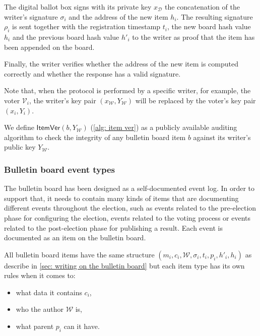 The digital ballot box signs with its private key $x_\mathcal{D}$ the concatenation of the writer's signature $\sigma_i$ and the address of the new item $h_i$. The resulting signature $\rho_i$ is sent together with the registration timestamp $t_i$, the new board hash value $h_i$ and the previous board hash value $h'_i$ to the writer as proof that the item has been appended on the board.

Finally, the writer verifies whether the address of the new item is computed correctly and whether the response has a valid signature.

Note that, when the protocol is performed by a specific writer, for example, the voter $\mathcal{V}_i$, the writer's key pair $(x_\mathcal{W}, Y_\mathcal{W})$ will be replaced by the voter's key pair $(x_i, Y_i)$.

We define $\mathsf{ItemVer}(b, Y_\mathcal{W})$ (\cref{alg: item ver}) as a publicly available auditing algorithm to check the integrity of any bulletin board item $b$ against its writer's public key $Y_\mathcal{W}$.

\begin{algorithm}[ht]
    \DontPrintSemicolon
    \caption{$\mathsf{ItemVer}(b, Y_\mathcal{W})$}

    \label{alg: item ver}
\end{algorithm}


\subsubsection{Bulletin board event types} \label{sec: bulletin board event types}
The bulletin board has been designed as a self-documented event log. In order to support that, it needs to contain many kinds of items that are documenting different events throughout the election, such as events related to the pre-election phase for configuring the election, events related to the voting process or events related to the post-election phase for publishing a result. Each event is documented as an item on the bulletin board.

All bulletin board items have the same structure $(m_i, c_i, \mathcal{W}, \sigma_i, t_i, p_i, h'_i, h_i)$ as describe in \cref{sec: writing on the bulletin board} but each item type has its own rules when it comes to:
\begin{itemize}
    \item what data it contains $c_i$,
    \item who the author $\mathcal{W}$ is,
    \item what parent $p_i$ can it have.
\end{itemize}

